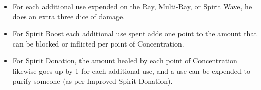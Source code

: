 
\begin{itemize}
    \item{For each additional use expended on the Ray, Multi-Ray, or Spirit Wave, he does an extra three dice of damage.}
    \item{For Spirit Boost each additional use spent adds one point to the amount that can be blocked or inflicted per point of Concentration.}
    \item{For Spirit Donation, the amount healed by each point of Concentration likewise goes up by 1 for each additional use, and a use can be expended to purify someone (as per Improved Spirit Donation).}
\end{itemize}